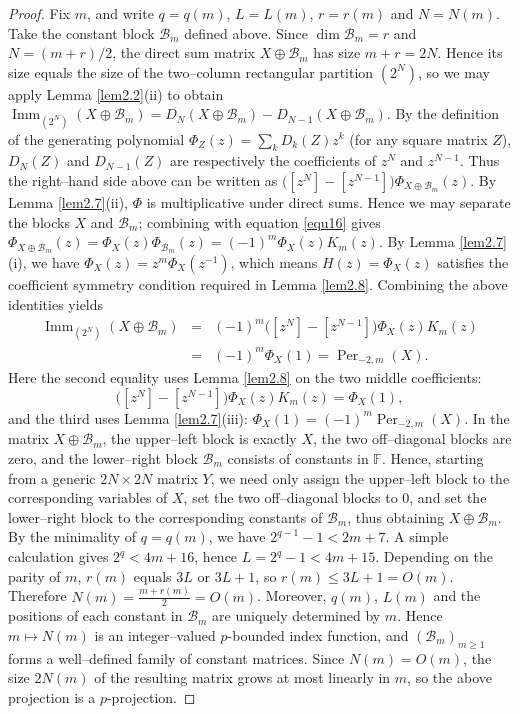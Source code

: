 \documentclass[11pt,a4paper]{article}
\begin{document}
\begin{proof}
Fix $m$, and write $q=q(m)$, $L=L(m)$, $r=r(m)$ and $N=N(m)$. Take the constant block $\mathcal B_m$ defined above. Since $\dim\mathcal B_m=r$ and $N=(m+r)/2$, the direct sum matrix $X\oplus\mathcal B_m$ has size $m+r=2N$.
Hence its size equals the size of the two–column rectangular partition $(2^N)$, so we may apply Lemma \ref{lem2.2}(ii) to obtain
$\operatorname{Imm}_{(2^N)}(X\oplus\mathcal B_m)=D_N(X\oplus\mathcal B_m)-D_{N-1}(X\oplus\mathcal B_m)$.
By the definition of the generating polynomial
$\Phi_Z(z)=\sum_kD_k(Z)z^k$ (for any square matrix $Z$), $D_N(Z)$ and $D_{N-1}(Z)$ are respectively the coefficients of $z^N$ and $z^{N-1}$. Thus the right–hand side above can be written as $\bigl([z^N]-[z^{N-1}]\bigr)\Phi_{X\oplus\mathcal B_m}(z)$.
By Lemma \ref{lem2.7}(ii), $\Phi$ is multiplicative under direct sums. Hence we may separate the blocks $X$ and $\mathcal B_m$; combining with equation \eqref{equ16} gives
$\Phi_{X\oplus\mathcal B_m}(z)=\Phi_X(z)\Phi_{\mathcal B_m}(z)=(-1)^m\Phi_X(z)K_m(z)$.
By Lemma \ref{lem2.7}(i), we have $\Phi_X(z)=z^m\Phi_X(z^{-1})$, which means $H(z)=\Phi_X(z)$ satisfies the coefficient symmetry condition required in Lemma \ref{lem2.8}. Combining the above identities yields
\begin{eqnarray*}
  \operatorname{Imm}_{(2^N)}(X\oplus\mathcal B_m)
  &=&(-1)^m\bigl([z^N]-[z^{N-1}]\bigr)
    \Phi_X(z)K_m(z) \\
  &=&(-1)^m\Phi_X(1)=\operatorname{Per}_{-2,m}(X).
\end{eqnarray*}
Here the second equality uses Lemma \ref{lem2.8} on the two middle coefficients:
$$\bigl([z^N]-[z^{N-1}]\bigr)\Phi_X(z)K_m(z)=\Phi_X(1),$$
and the third uses Lemma \ref{lem2.7}(iii): $\Phi_X(1)=(-1)^m\operatorname{Per}_{-2,m}(X)$. In the matrix $X\oplus\mathcal B_m$, the upper–left block is exactly $X$, the two off–diagonal blocks are zero, and the lower–right block $\mathcal B_m$ consists of constants in $\mathbb{F}$. Hence, starting from a generic $2N\times 2N$ matrix $Y$, we need only assign the upper–left block to the corresponding variables of $X$, set the two off–diagonal blocks to $0$, and set the lower–right block to the corresponding constants of $\mathcal B_m$, thus obtaining $X\oplus\mathcal B_m$. By the minimality of $q=q(m)$, we have $2^{q-1}-1<2m+7$. A simple calculation gives $2^q<4m+16$, hence $L=2^q-1<4m+15$.
Depending on the parity of $m$, $r(m)$ equals $3L$ or $3L+1$, so $r(m)\leq3L+1=O(m)$. Therefore $N(m)=\frac{m+r(m)}{2}=O(m)$.
Moreover, $q(m)$, $L(m)$ and the positions of each constant in $\mathcal B_m$ are uniquely determined by $m$. Hence $m\mapsto N(m)$ is an integer–valued $p$-bounded index function, and $(\mathcal B_m)_{m\geq1}$ forms a well–defined family of constant matrices. Since $N(m)=O(m)$, the size $2N(m)$ of the resulting matrix grows at most linearly in $m$, so the above projection is a $p$-projection.
\end{proof}
\end{document}
